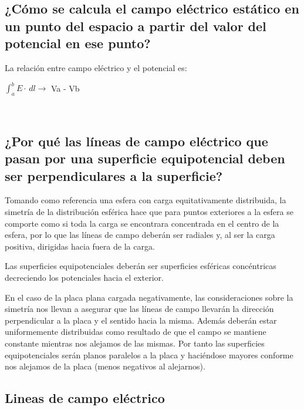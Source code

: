 \documentclass[letterpaper, 12pt]{report}
\begin{document}
\subsection{¿Cómo se calcula el campo eléctrico estático en un punto del espacio a partir del valor del
	potencial en ese punto?}

La relación entre campo eléctrico y el potencial es:

$\int_{a}^{b} E \cdot\,dl \longrightarrow$ Va - Vb

~\cite{PotencialElectrico}

\subsection{¿Por qué las líneas de campo eléctrico que pasan por una superficie equipotencial deben ser
	perpendiculares a la superficie?}

Tomando como referencia una esfera con carga equitativamente distribuida,
la simetría de la distribución esférica hace que para puntos exteriores a
la esfera se comporte como si toda la carga se encontrara concentrada en
el centro de la esfera, por lo que las líneas de campo deberán ser radiales
y, al ser la carga positiva, dirigidas hacia fuera de la carga.

\vspace{.5cm}

Las superficies equipotenciales deberán ser superficies esféricas concéntricas
decreciendo los potenciales hacia el exterior.

\vspace{.5cm}

En el caso de la placa plana cargada negativamente, las consideraciones sobre
la simetría nos llevan a asegurar que las líneas de campo llevarán la
dirección perpendicular a la placa y el sentido hacia la misma. Además
deberán estar uniformemente distribuidas como resultado de que el campo se
mantiene constante mientras nos alejamos de las mismas. Por tanto las
superficies equipotenciales serán planos paralelos a la placa y haciéndose
mayores conforme nos alejamos de la placa (menos negativos al alejarnos).
~\cite{LineasCampoElectrico}

\subsection{Lineas de campo eléctrico}
\end{document}
